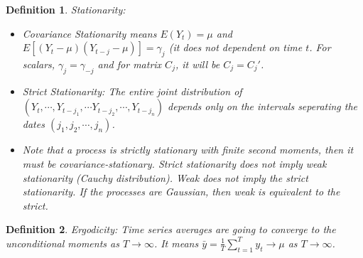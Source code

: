 \documentclass[11pt, a4paper, oneside]{article}
\newtheorem{mydef}{Definition}
\theoremstyle{definition}
\theoremstyle{proposition}
\theoremstyle{corollary}
\theoremstyle{lemma}
\theoremstyle{theorem}
\begin{document}
\begin{mydef}
Stationarity: 
\begin{itemize}
\item Covariance Stationarity means $E(Y_t) = \mu$ and $E[(Y_t- \mu)(Y_{t - j}- \mu)] = \gamma_j$ (it does not dependent on time $t$. For scalars, $\gamma_j = \gamma_{-j}$ and for matrix $C_j$, it will be $C_j = C_j'$. 
\item Strict Stationarity: The entire joint distribution of $(Y_t, \cdots, Y_{t-j_1}, \cdots Y_{t-j_2}, \cdots, Y_{t-j_n})$ depends only on the intervals seperating the dates $(j_1, j_2, \cdots, j_n)$. 
\item Note that a process is strictly stationary with finite second moments, then it must be covariance-stationary. Strict stationarity does not imply weak stationarity (Cauchy distribution). Weak does not imply the strict stationarity. If the processes are Gaussian, then weak is equivalent to the strict. 
\end{itemize}
\end{mydef}

\begin{mydef}
Ergodicity: Time series averages are going to converge to the unconditional moments as $T \to \infty$. It means $\bar{y} = \frac{1}{T}\sum_{t =1}^T y_t \to \mu$ as $T\to \infty$. 
\end{mydef}
\end{document}
